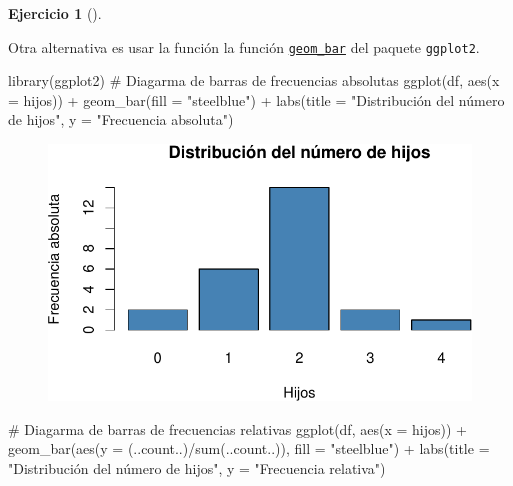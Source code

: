 \documentclass[
  a4paper,
]{scrreport}
\newenvironment{Shaded}{\begin{snugshade}}{\end{snugshade}}
\newcommand{\AttributeTok}[1]{\textcolor[rgb]{0.40,0.45,0.13}{#1}}
\newcommand{\CommentTok}[1]{\textcolor[rgb]{0.37,0.37,0.37}{#1}}
\newcommand{\FunctionTok}[1]{\textcolor[rgb]{0.28,0.35,0.67}{#1}}
\newcommand{\NormalTok}[1]{\textcolor[rgb]{0.00,0.23,0.31}{#1}}
\newcommand{\SpecialCharTok}[1]{\textcolor[rgb]{0.37,0.37,0.37}{#1}}
\newcommand{\StringTok}[1]{\textcolor[rgb]{0.13,0.47,0.30}{#1}}
\theoremstyle{definition}
\newtheorem{exercise}{Ejercicio}[chapter]
\theoremstyle{remark}
\begin{document}
\begin{exercise}[]
\begin{tcolorbox}
Otra alternativa es usar la función la función
\href{https://aprendeconalf.es/manual-r/07-graficos.html\#diagramas-de-barras}{\texttt{geom\_bar}}
del paquete \texttt{ggplot2}.

\begin{Shaded}
\begin{Highlighting}[]
\FunctionTok{library}\NormalTok{(ggplot2)}
\CommentTok{\# Diagarma de barras de frecuencias absolutas}
\FunctionTok{ggplot}\NormalTok{(df, }\FunctionTok{aes}\NormalTok{(}\AttributeTok{x =}\NormalTok{ hijos)) }\SpecialCharTok{+}
    \FunctionTok{geom\_bar}\NormalTok{(}\AttributeTok{fill =} \StringTok{"steelblue"}\NormalTok{) }\SpecialCharTok{+} 
    \FunctionTok{labs}\NormalTok{(}\AttributeTok{title =} \StringTok{"Distribución del número de hijos"}\NormalTok{, }\AttributeTok{y =} \StringTok{"Frecuencia absoluta"}\NormalTok{)}
\end{Highlighting}
\end{Shaded}

\begin{figure}[H]

{\centering \includegraphics{./03-frecuencias-graficos_files/figure-pdf/unnamed-chunk-6-1.pdf}

}

\end{figure}

\begin{Shaded}
\begin{Highlighting}[]
\CommentTok{\# Diagarma de barras de frecuencias relativas}
\FunctionTok{ggplot}\NormalTok{(df, }\FunctionTok{aes}\NormalTok{(}\AttributeTok{x =}\NormalTok{ hijos)) }\SpecialCharTok{+}
    \FunctionTok{geom\_bar}\NormalTok{(}\FunctionTok{aes}\NormalTok{(}\AttributeTok{y =}\NormalTok{ (..count..)}\SpecialCharTok{/}\FunctionTok{sum}\NormalTok{(..count..)), }\AttributeTok{fill =} \StringTok{"steelblue"}\NormalTok{) }\SpecialCharTok{+}
    \FunctionTok{labs}\NormalTok{(}\AttributeTok{title =} \StringTok{"Distribución del número de hijos"}\NormalTok{, }\AttributeTok{y =} \StringTok{"Frecuencia relativa"}\NormalTok{)}
\end{Highlighting}
\end{Shaded}


\end{tcolorbox}
\end{exercise}
\end{document}
